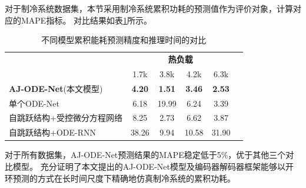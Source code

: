 对于制冷系统数据集，本节采用制冷系统累积功耗的预测值作为评价对象，计算对应的MAPE指标。
对比结果如表\ref{tab:Compare power}所示。
\begin{table}[t]
    \centering
    \caption{不同模型累积能耗预测精度和推理时间的对比}
    \begin{tabular}{lccccc} 
    \toprule
                                & \multicolumn{4}{c}{\textbf{\textbf{热负载}}} \\
    \multicolumn{1}{c}{}        & 1.7k          & 3.8k          & 4.2k          & 6.3k\\ 
    \hline
    \textbf{AJ-ODE-Net}(本文模型) & \textbf{4.20} & \textbf{1.51} & \textbf{3.46} & \textbf{2.53}            \\
    单个ODE-Net              & 6.18          & 19.99         & 6.24          & 3.39    \\
    自跳跃结构+受控微分方程网络\cite{kidger2020neural}     & 8.25         & 2.73          & 6.62         & 3.87           \\
    自跳跃结构+ODE-RNN & 38.26         & 9.94          & 10.58         & 31.90    \\
    \bottomrule
    \end{tabular}
    \label{tab:Compare power}
\end{table}
对于所有数据集，AJ-ODE-Net预测结果的MAPE稳定低于5\%，优于其他三个对比模型。
充分证明了本文提出的AJ-ODE-Net模型及编码器解码器框架能够以开环预测的方式在长时间尺度下精确地仿真制冷系统的累积功耗。

